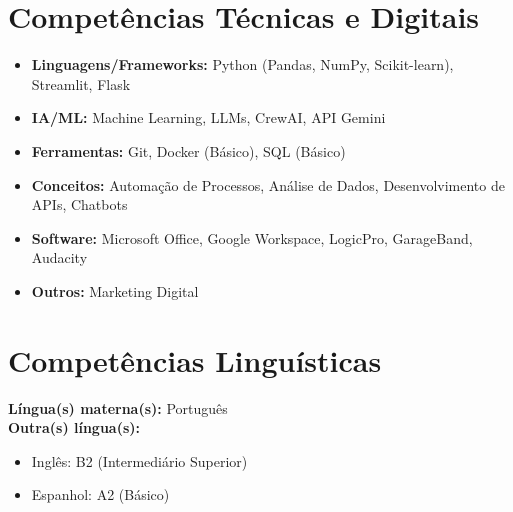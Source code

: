 \documentclass[11pt]{article}
\begin{document}
\section*{Competências Técnicas e Digitais}
\begin{itemize}
    \item \textbf{Linguagens/Frameworks:} Python (Pandas, NumPy, Scikit-learn), Streamlit, Flask
    \item \textbf{IA/ML:} Machine Learning, LLMs, CrewAI, API Gemini
    \item \textbf{Ferramentas:} Git, Docker (Básico), SQL (Básico)
    \item \textbf{Conceitos:} Automação de Processos, Análise de Dados, Desenvolvimento de APIs, Chatbots
    \item \textbf{Software:} Microsoft Office, Google Workspace, LogicPro, GarageBand, Audacity
    \item \textbf{Outros:} Marketing Digital
\end{itemize}


\section*{Competências Linguísticas}
\textbf{Língua(s) materna(s):} Português \\
\textbf{Outra(s) língua(s):}
\begin{itemize}
    \item Inglês: B2 (Intermediário Superior)
    \item Espanhol: A2 (Básico)
\end{itemize}

\end{document}
